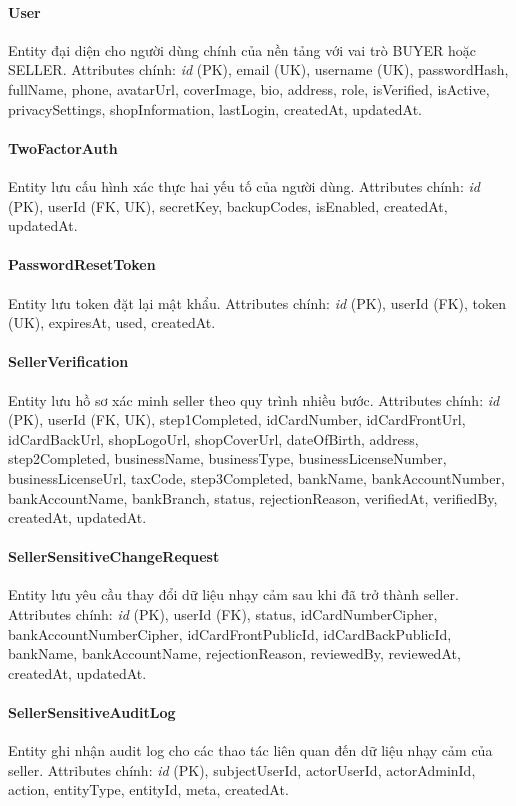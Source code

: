 \paragraph{User} Entity đại diện cho người dùng chính của nền tảng với vai trò BUYER hoặc SELLER. Attributes chính: \textit{id} (PK), email (UK), username (UK), passwordHash, fullName, phone, avatarUrl, coverImage, bio, address, role, isVerified, isActive, privacySettings, shopInformation, lastLogin, createdAt, updatedAt.

\paragraph{TwoFactorAuth} Entity lưu cấu hình xác thực hai yếu tố của người dùng. Attributes chính: \textit{id} (PK), userId (FK, UK), secretKey, backupCodes, isEnabled, createdAt, updatedAt.

\paragraph{PasswordResetToken} Entity lưu token đặt lại mật khẩu. Attributes chính: \textit{id} (PK), userId (FK), token (UK), expiresAt, used, createdAt.

\paragraph{SellerVerification} Entity lưu hồ sơ xác minh seller theo quy trình nhiều bước. Attributes chính: \textit{id} (PK), userId (FK, UK), step1Completed, idCardNumber, idCardFrontUrl, idCardBackUrl, shopLogoUrl, shopCoverUrl, dateOfBirth, address, step2Completed, businessName, businessType, businessLicenseNumber, businessLicenseUrl, taxCode, step3Completed, bankName, bankAccountNumber, bankAccountName, bankBranch, status, rejectionReason, verifiedAt, verifiedBy, createdAt, updatedAt.

\paragraph{SellerSensitiveChangeRequest} Entity lưu yêu cầu thay đổi dữ liệu nhạy cảm sau khi đã trở thành seller. Attributes chính: \textit{id} (PK), userId (FK), status, idCardNumberCipher, bankAccountNumberCipher, idCardFrontPublicId, idCardBackPublicId, bankName, bankAccountName, rejectionReason, reviewedBy, reviewedAt, createdAt, updatedAt.

\paragraph{SellerSensitiveAuditLog} Entity ghi nhận audit log cho các thao tác liên quan đến dữ liệu nhạy cảm của seller. Attributes chính: \textit{id} (PK), subjectUserId, actorUserId, actorAdminId, action, entityType, entityId, meta, createdAt.

